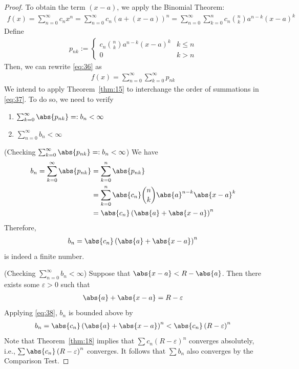 \documentclass[thmcnt=section, 12pt]{elegantbook}
\begin{document}
\begin{proof}
    To obtain the term $(x-a)$, we apply the Binomial Theorem:
    \begin{align}
        f(x) = \sum_{n=0}^\infty c_n x^n
        = \sum_{n=0}^\infty c_n \left(a + (x-a)\right)^n
        = \sum_{n=0}^\infty \sum_{k=0}^n c_n \binom{n}{k} a^{n-k} (x-a)^k
        \label{eq:36}
    \end{align}
    Define 
    \begin{align*}
        p_{nk} := \begin{cases}
            c_n \binom{n}{k} a^{n-k} (x-a)^k &k \leq n \\ 
            0 &k > n
        \end{cases}
    \end{align*}
    Then, we can rewrite \eqref{eq:36} as 
    \begin{align}
        f(x) = \sum_{n=0}^\infty \sum_{k=0}^\infty p_{nk}
        \label{eq:37}
    \end{align}
    We intend to apply Theorem~\ref{thm:15} to interchange the order of summations in \eqref{eq:37}. To do so, we need to verify 
    \begin{enumerate}
        \item $\sum_{k=0}^\infty \abs{p_{nk}} =: b_n < \infty$
        \item $\sum_{n=0}^\infty b_n < \infty$
    \end{enumerate}

    \par (Checking $\sum_{k=0}^\infty \abs{p_{nk}} =: b_n < \infty$) We have 
    \begin{align*}
        b_n = \sum_{k=0}^\infty \abs{p_{nk}}
        &= \sum_{k=0}^n \abs{p_{nk}} \\ 
        &= \sum_{k=0}^n \abs{c_n} \binom{n}{k} \abs{a}^{n-k} \abs{x-a}^k \\ 
        &= \abs{c_n} \left(\abs{a} + \abs{x-a}\right)^n
    \end{align*}
    Therefore, 
    \begin{align}
        b_n = \abs{c_n} \left(\abs{a} + \abs{x-a}\right)^n
        \label{eq:38}
    \end{align}
    is indeed a finite number.

    \par (Checking $\sum_{n=0}^\infty b_n < \infty$) Suppose that $\abs{x-a} < R - \abs{a}$. Then there exists some $\varepsilon > 0$ such that 
    \begin{align*}
        \abs{a} + \abs{x-a} = R - \varepsilon
    \end{align*}
    Applying \eqref{eq:38}, $b_n$ is bounded above by 
    \begin{align*}
        b_n = \abs{c_n} \left(\abs{a} + \abs{x-a}\right)^n
        < \abs{c_n} \left(R - \varepsilon\right)^n
    \end{align*}
    Note that Theorem~\ref{thm:18} implies that $\sum c_n (R-\varepsilon)^n$ converges absolutely, i.e., $\sum \abs{c_n} \left(R - \varepsilon\right)^n$ converges. It follows that $\sum b_n$ also converges by the Comparison Test. 


\end{proof}
\end{document}
